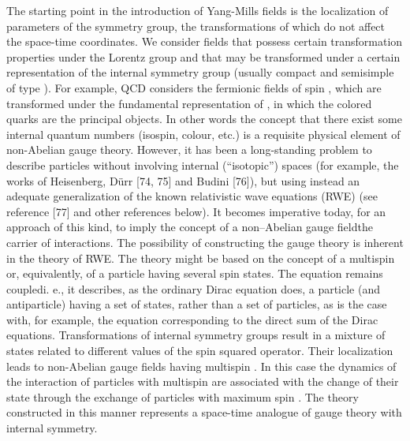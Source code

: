 \documentclass[a4paper,12pt]{article}
\begin{document}
The starting point in the introduction of Yang-Mills fields is the
localization of parameters of the symmetry group, the
transformations of which do not affect the space-time coordinates.
We consider fields \coordHE{} that possess certain transformation
properties under the Lorentz group and that may be transformed
under a certain representation of the internal symmetry group
(usually compact and semisimple of type \coordHE{}). For example, QCD
considers the fermionic fields of spin \coordHE{}, which are
transformed under the fundamental representation of \coordHE{}, in
which the colored quarks are the principal objects. In other words
the concept that there exist some internal quantum numbers
(isospin, colour, etc.) is a requisite physical element of
non-Abelian gauge theory. However, it has been a long-standing
problem to describe particles without involving internal
(``isotopic'') spaces (for example, the works of Heisenberg,
D\"urr [74, 75] and Budini [76]), but using instead an adequate
generalization of the known relativistic wave equations (RWE) (see
reference [77] and other references below). It becomes imperative
today, for an approach of this kind, to imply the concept of a
non--Abelian gauge field\myHighlight{$-$}\coordHE{}the carrier of interactions. The
possibility of constructing the gauge theory is inherent in the
theory of RWE. The theory might be based on the concept of a
multispin or, equivalently, of a particle having several spin
states. The equation remains coupled\myHighlight{$-$}\coordHE{}i. e., it describes, as the
ordinary Dirac equation does, a particle (and antiparticle) having
a set of states, rather than a set of particles, as is the case
with, for example, the equation corresponding to the direct sum of
the Dirac equations. Transformations of internal symmetry groups
result in a mixture of states related to different values of the
spin squared operator. Their localization leads to non-Abelian
gauge fields having multispin \coordHE{}. In this case the dynamics
of the interaction of particles with multispin \coordHE{} are
associated with the change of their state through the exchange of
particles with maximum spin \coordHE{}. The theory constructed in this
manner represents a space-time analogue of gauge theory with
internal symmetry.
\end{document}
